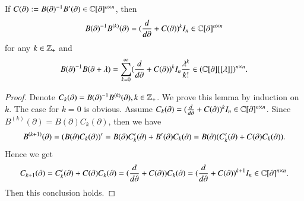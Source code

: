 \documentclass[12pt]{amsart}
\begin{document}
\begin{lem}\label{lem-BC}If $C(\partial):=B(\partial)^{-1}B'(\partial)\in \mathbb{C}[\partial]^{n\times n}$, then
\begin{equation}\label{e1}
B(\partial)^{-1}B^{(k)}(\partial)=(\frac{d}{d\partial}+C(\partial))^kI_n\in \mathbb{C}[\partial]^{n\times n}
\end{equation}
for any $k\in\mathbb{Z}_+$ and $$B(\partial)^{-1}B(\partial+\lambda)=\sum_{k=0}^\infty (\frac{d}{d\partial}+C(\partial))^kI_n\frac{\lambda^k}{k!}\in
(\mathbb{C}[\partial][[\lambda]])^{n\times n}.$$
\end{lem}
\begin{proof}
Denote $C_k(\partial)=B(\partial)^{-1}B^{(k)}(\partial), k\in\mathbb{Z}_+$.
We prove this lemma by induction on $k$. %
The case for $k=0$ is obvious.
Assume $C_k(\partial)=(\frac{d}{d\partial}+C(\partial))^kI_n\in \mathbb{C}[\partial]^{n\times n}$. Since
$B^{(k)}(\partial)=B(\partial)C_k(\partial)$, then we have
\begin{equation*}
\aligned
B^{(k+1)}(\partial)%
=(B(\partial)C_k(\partial))'
=B(\partial)C'_k(\partial)+B'(\partial)C_k(\partial)
=B(\partial)(C'_k(\partial)+C(\partial)C_k(\partial)).
\endaligned
\end{equation*}
Hence we get
$$C_{k+1}(\partial)=C'_k(\partial)+C(\partial)C_k(\partial)
=(\frac{d}{d\partial}+C(\partial))C_k(\partial)
=(\frac{d}{d\partial}+C(\partial))^{k+1}I_n\in \mathbb{C}[\partial]^{n\times n}.$$%
Then this conclusion holds.
\end{proof}

\end{document}
